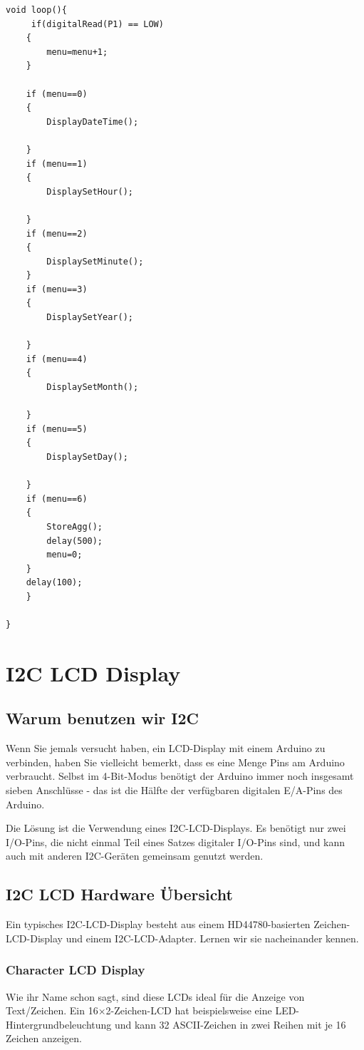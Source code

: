 \documentclass[conference]{IEEEtran}
\begin{document}
\begin{lstlisting}[style=CStyle]
void loop(){
	 if(digitalRead(P1) == LOW)
	{
		menu=menu+1;
	}
	
	if (menu==0)
	{
		DisplayDateTime();
		
	}
	if (menu==1)
	{
		DisplaySetHour();
		
	}
	if (menu==2)
	{
		DisplaySetMinute();
	}
	if (menu==3)
	{
		DisplaySetYear();
		
	}
	if (menu==4)
	{
		DisplaySetMonth();
		
	}
	if (menu==5)
	{
		DisplaySetDay();
		
	}
	if (menu==6)
	{
		StoreAgg(); 
		delay(500);
		menu=0;
	}
	delay(100);
	}

}
\end{lstlisting}\textbf{}

\section{I2C LCD Display}
\subsection{Warum benutzen wir I2C}
Wenn Sie jemals versucht haben, ein LCD-Display mit einem Arduino zu verbinden, haben Sie vielleicht bemerkt, dass es eine Menge Pins am Arduino verbraucht. Selbst im 4-Bit-Modus benötigt der Arduino immer noch insgesamt sieben Anschlüsse - das ist die Hälfte der verfügbaren digitalen E/A-Pins des Arduino.

Die Lösung ist die Verwendung eines I2C-LCD-Displays. Es benötigt nur zwei I/O-Pins, die nicht einmal Teil eines Satzes digitaler I/O-Pins sind, und kann auch mit anderen I2C-Geräten gemeinsam genutzt werden.

\subsection{I2C LCD Hardware Übersicht}

Ein typisches I2C-LCD-Display besteht aus einem HD44780-basierten Zeichen-LCD-Display und einem I2C-LCD-Adapter. Lernen wir sie nacheinander kennen.

\subsubsection{Character LCD Display}
Wie ihr Name schon sagt, sind diese LCDs ideal für die Anzeige von Text/Zeichen. Ein 16×2-Zeichen-LCD hat beispielsweise eine LED-Hintergrundbeleuchtung und kann 32 ASCII-Zeichen in zwei Reihen mit je 16 Zeichen anzeigen.
\end{document}
